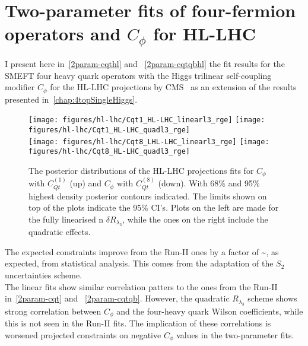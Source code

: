\chapter{ Two-parameter fits of four-fermion operators and $C_\phi$ for HL-LHC}\label{app:hz}
\label{app:due}
I present here in~\autoref{2param-cqthl} and ~\autoref{2param-cqtqbhl} the fit results for the SMEFT four heavy quark operators with the Higgs trilinear self-coupling modifier $C_\phi$ for the HL-LHC projections by CMS~\cite{CMS-PAS-FTR-18-011,twiki} as an extension of the results presented in~\autoref{chap:4topSingleHiggs}.\\
\begin{figure}[htpb!]
	\vspace{-0.7 cm}
\begin{center}
	\texttt{[image: figures/hl-lhc/Cqt1\_HL-LHC\_linearl3\_rge]}
	\texttt{[image: figures/hl-lhc/Cqt1\_HL-LHC\_quadl3\_rge]} \\ 
	\texttt{[image: figures/hl-lhc/Cqt8\_LHL-LHC\_linearl3\_rge]}
	\texttt{[image: figures/hl-lhc/Cqt8\_HL-LHC\_quadl3\_rge]} 
\end{center}
\caption{The posterior distributions of the HL-LHC projections fits for $C_\phi$ with $C_{Qt}^{(1)}$ (up) and $C_\phi$ with $C_{Qt}^{(8)}$ (down). With 68\% and 95\% highest density posterior contours indicated. The limits shown on top of the plots indicate the 95\% CI's. Plots on the left are made for the fully linearised n $\delta R_{\lambda_3}$, while the ones on the right include the quadratic effects.  \label{2param-cqthl}   }
\end{figure}
The expected constraints improve from the Run-II ones by a factor of 
\be
 \sim{},
\ee
as expected, from statistical analysis. This comes from the adaptation of the $S_2$ uncertainties scheme.  \\ The linear fits show similar correlation patters to the ones from the Run-II in~\autoref{2param-cqt} and ~\autoref{2param-cqtqb}. However, the quadratic $R_{\lambda_3}$ scheme shows strong correlation between $C_\phi$ and the four-heavy quark Wilson coefficients, while this is not seen in the Run-II fits. The implication of these correlations is worsened projected constraints on negative $C_\phi$ values in the two-parameter fits. 
